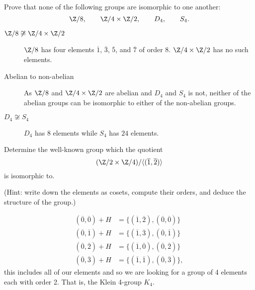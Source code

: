 
\setcounter{question}{24}
\question Prove that none of the following groups are isomorphic to one another:
\[
    \Z/8, \qquad \Z/4 \times \Z/2, \qquad D_4, \qquad S_4.
\]

\begin{solution}
    \begin{description}
        \item[$\Z/8 \not \cong \Z/4 \times \Z/2$] \hfill

            $\Z/8$ has four elements 
            $\overline 1$, 
            $\overline 3$, 
            $\overline 5$, and
            $\overline 7$ of order $8$.
            $\Z/4 \times \Z/2$ has no such elements.

        \item[Abelian to non-abelian] \hfill

            As $\Z/8$ and $\Z/4 \times \Z/2$ are abelian
            and $D_4$ and $S_4$ is not, neither of the abelian groups
            can be isomorphic to either of the non-abelian groups.

        \item[$D_4 \not \cong S_4$] \hfill

            $D_4$ has $8$ elements while $S_4$ has $24$ elements.
    \end{description}
\end{solution}

\setcounter{question}{28}
\question Determine the well-known group which the quotient
\[
    (\Z/2 \times \Z/4) / \langle (\overline 1, \overline 2) \rangle
\]
is isomorphic to.

(Hint: write down the elements as cosets, compute their orders, and deduce the
structure of the group.)

\begin{solution}
    \begin{align*}
        (\overline 0, \overline 0) + H &= \{(\overline 1,\overline 2), (\overline 0, \overline 0)\} \\
        (\overline 0, \overline 1) + H &= \{(\overline 1,\overline 3), (\overline 0, \overline 1)\} \\
        (\overline 0, \overline 2) + H &= \{(\overline 1,\overline 0), (\overline 0, \overline 2)\} \\
        (\overline 0, \overline 3) + H &= \{(\overline 1,\overline 1), (\overline 0, \overline 3)\},
    \end{align*}
    this includes all of our elements and so we are looking for a group of 4 elements each with
    order 2.
    That is,
    the Klein 4-group $K_4$.
\end{solution}

